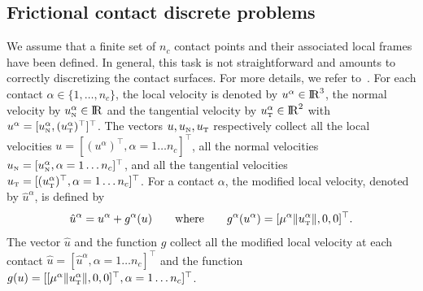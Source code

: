 {%



\subsection{Frictional contact discrete problems}


 We assume that a finite set of $n_c$ contact points and their associated local frames have been defined.
 In general, this task is not straightforward and amounts to correctly discretizing  the contact surfaces. For more details, we refer to~\cite{Wriggers2006,Laursen2003}.
%
For each contact $\alpha \in \{1,\ldots, n_c\}$, the local velocity is denoted by $u^\alpha \in \mathrm{I\!R}^3$, the normal velocity by $u_{\hbox{\tiny{N}}}^{\alpha}\in \mathrm{I\!R}$ and the tangential velocity by $u_{\hbox{\tiny{T}}}^\alpha\in\mathrm{I\!R}^2$ with $u^\alpha = [u^\alpha_{{\hbox{\tiny{N}}}}, (u^\alpha_{{\hbox{\tiny{T}}}})^\top]^\top$.
The vectors $u, u_{\hbox{\tiny{N}}}, u_{\hbox{\tiny{T}}}$ respectively collect all the local velocities
$u = [(u^\alpha)^\top, \alpha = 1\ldots n_c]^\top$,
all the normal velocities
$u_{\hbox{\tiny{N}}} = [ u^\alpha_{{\hbox{\tiny{N}}}}, \alpha = 1\ldots n_c]^\top$,
and all the  tangential velocities
$u_{\hbox{\tiny{T}}} = [(u^\alpha_{{\hbox{\tiny{T}}}})^\top, \alpha = 1\ldots n_c]^\top$.
For a contact $\alpha $, the modified local velocity, denoted by $\hat u^\alpha $, is defined by
\begin{equation}
  \hat u^\alpha = u^\alpha + g^\alpha(u)\qquad\text{where}\qquad
 g^\alpha(u^\alpha) =  [\mu^\alpha  \|u^\alpha_\t\|, 0, 0 ]^\top.
  \label{eq:modified}
\end{equation}
The vector $\hat u$ and the function $g$ collect all the modified local velocity at each contact $\hat u = [\hat u^\alpha, \alpha = 1\ldots n_c]^\top$ and the function $g(u) = [[\mu^\alpha  \|u^\alpha_{\hbox{\tiny{T}}}\|, 0, 0]^\top, \alpha = 1\ldots n_c]^\top$.

}
